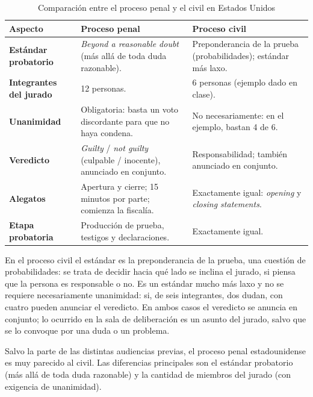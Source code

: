 \documentclass[12pt,oneside]{book}
\begin{document}
\begin{table}[H]
\centering
\small
\caption{Comparación entre el proceso penal y el civil en Estados Unidos}
\begin{tabularx}{\textwidth}{>{\raggedright\arraybackslash}p{} L L}
\toprule
\textbf{Aspecto} & \textbf{Proceso penal} & \textbf{Proceso civil} \\
\midrule
\textbf{Estándar probatorio} & \textit{Beyond a reasonable doubt} (más allá de toda duda razonable). & Preponderancia de la prueba (probabilidades); estándar más laxo. \\
\addlinespace
\textbf{Integrantes del jurado} & 12 personas. & 6 personas (ejemplo dado en clase). \\
\addlinespace
\textbf{Unanimidad} & Obligatoria: basta un voto discordante para que no haya condena. & No necesariamente: en el ejemplo, bastan 4 de 6. \\
\addlinespace
\textbf{Veredicto} & \textit{Guilty} / \textit{not guilty} (culpable / inocente), anunciado en conjunto. & Responsabilidad; también anunciado en conjunto. \\
\addlinespace
\textbf{Alegatos} & Apertura y cierre; 15 minutos por parte; comienza la fiscalía. & Exactamente igual: \textit{opening} y \textit{closing statements}. \\
\addlinespace
\textbf{Etapa probatoria} & Producción de prueba, testigos y declaraciones. & Exactamente igual. \\
\bottomrule
\end{tabularx}
\end{table}

En el proceso civil el estándar es la preponderancia de la prueba, una cuestión de probabilidades: se trata de decidir hacia qué lado se inclina el jurado, si piensa que la persona es responsable o no. Es un estándar mucho más laxo y no se requiere necesariamente unanimidad: si, de seis integrantes, dos dudan, con cuatro pueden anunciar el veredicto. En ambos casos el veredicto se anuncia en conjunto; lo ocurrido en la sala de deliberación es un asunto del jurado, salvo que se lo convoque por una duda o un problema.

\begin{important}
Salvo la parte de las distintas audiencias previas, el proceso penal estadounidense es muy parecido al civil. Las diferencias principales son el estándar probatorio (más allá de toda duda razonable) y la cantidad de miembros del jurado (con exigencia de unanimidad).
\end{important}
\end{document}
